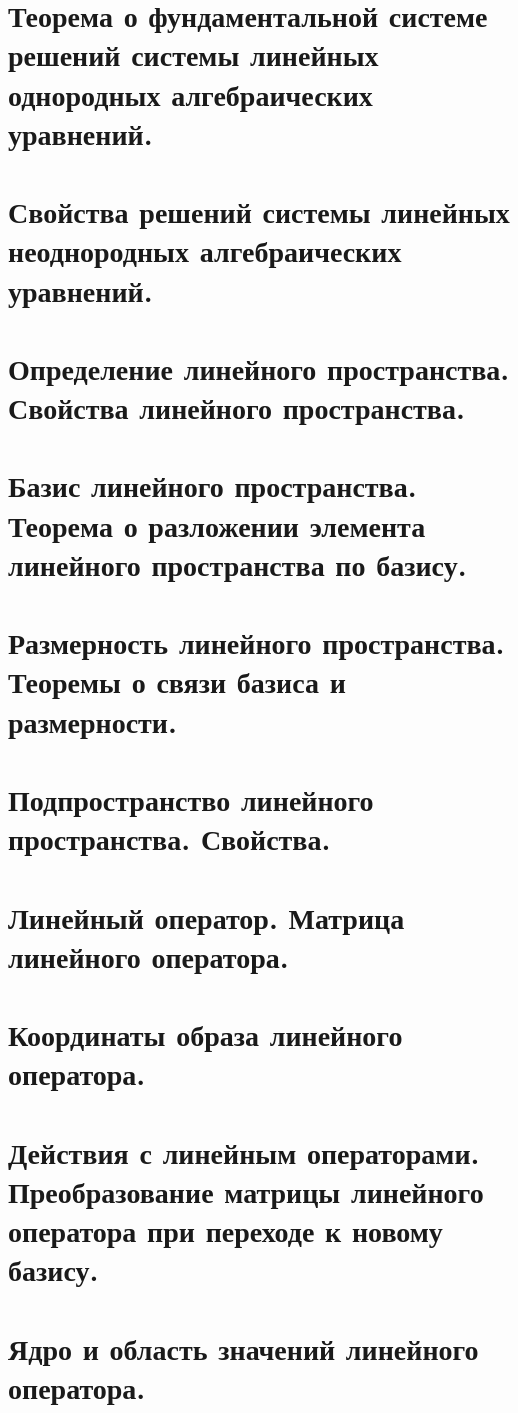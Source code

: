 \documentclass{article}
\begin{document}
\begin{sloppypar}
\section{Теорема о фундаментальной системе решений системы линейных однородных алгебраических уравнений.}

\section{Свойства решений системы линейных неоднородных алгебраических уравнений.}

\section{Определение линейного пространства. Свойства линейного пространства. }

\section{Базис линейного пространства. Теорема о разложении элемента линейного пространства по базису.}

\section{Размерность линейного пространства. Теоремы о связи базиса и размерности.}

\section{Подпространство линейного пространства. Свойства.}

\section{Линейный оператор. Матрица линейного оператора.}

\section{Координаты образа линейного оператора.}

\section{Действия с линейным операторами. Преобразование матрицы линейного оператора при переходе к новому базису.}

\section{Ядро и область значений линейного оператора.}


\end{sloppypar}
\end{document}
